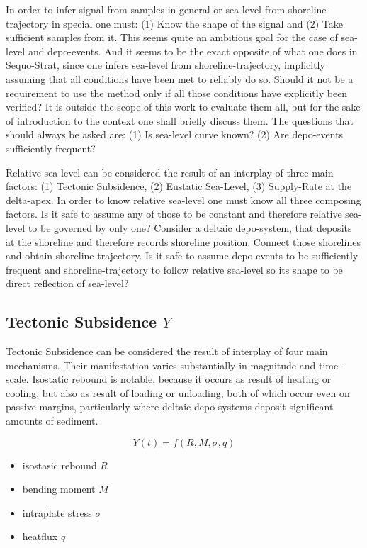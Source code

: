 \documentclass[12pt]{article}
\begin{document}
In order to infer signal from samples in general or sea-level from shoreline-trajectory in special one must: (1) Know the shape of the signal and (2) Take sufficient samples from it. This seems quite an ambitious goal for the case of sea-level and depo-events. And it seems to be the exact opposite of what one does in Sequo-Strat, since one infers sea-level from shoreline-trajectory, implicitly assuming that all conditions have been met to reliably do so. Should it not be a requirement to use the method only if all those conditions have explicitly been verified? It is outside the scope of this work to evaluate them all, but for the sake of introduction to the context one shall briefly discuss them. The questions that should always be asked are: (1) Is sea-level curve known? (2) Are depo-events sufficiently frequent?

Relative sea-level can be considered the result of an interplay of three main factors: (1) Tectonic Subsidence, (2) Eustatic Sea-Level, (3) Supply-Rate at the delta-apex. In order to know relative sea-level one must know all three composing factors. Is it safe to assume any of those to be constant and therefore relative sea-level to be governed by only one? Consider a deltaic depo-system, that deposits at the shoreline and therefore records shoreline position. Connect those shorelines and obtain shoreline-trajectory. Is it safe to assume depo-events to be sufficiently frequent and shoreline-trajectory to follow relative sea-level so its shape to be direct reflection of sea-level?

\subsection*{Tectonic Subsidence $Y$}

Tectonic Subsidence can be considered the result of interplay of four main mechanisms. Their manifestation varies substantially in magnitude and time-scale. Isostatic rebound is notable, because it occurs as result of heating or cooling, but also as result of loading or unloading, both of which occur even on passive margins, particularly where deltaic depo-systems deposit significant amounts of sediment.

$$
Y(t) = f(R,M,\sigma,q)
$$

\begin{itemize}
  \item isostasic rebound $R$
  \item bending moment $M$
  \item intraplate stress $\sigma$
  \item heatflux $q$
\end{itemize}
\end{document}
